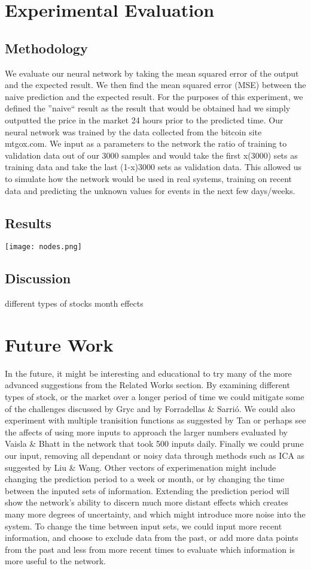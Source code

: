 \documentclass[a4paper,11pt]{article}
\begin{document}
\section{Experimental Evaluation}
\subsection{Methodology}
We evaluate our neural network by taking the mean squared error of the output and the expected result. We then find the mean squared error (MSE) between the naive prediction and the expected result. For the purposes of this experiment, we defined the ''naive`` result as the result that would be obtained had we simply outputted the price in the market 24 hours prior to the predicted time. 
Our neural network was trained by the data collected from the bitcoin site mtgox.com. We input as a parameters to the network the ratio of training to validation data out of our 3000 samples and would take the first x(3000) sets as training data and take the last (1-x)3000 sets as validation data. This allowed us to simulate  how the network would be used in real systems, training on recent data and predicting the unknown values for events in the next few days/weeks. 
\subsection{Results}

\texttt{[image: nodes.png]}
\subsection{Discussion}
different types of stocks
month effects


\section{Future Work}

In the future, it might be interesting and educational to try many of the more advanced suggestions from the Related Works section. By examining different types of stock, or the market over a longer period of time we could mitigate some of the challenges discussed by Gryc and  by Forradellas \& Sarrió. We could also experiment with multiple tranisition functions as suggested by Tan or perhaps see the affects of using more inputs to approach the larger numbers evaluated by Vaisla \& Bhatt in the network that took 500 inputs daily. Finally we could prune our input, removing all dependant or noisy data through methods such as ICA as suggested by Liu \& Wang. Other vectors of experimenation might include changing the prediction period to a week or month, or by changing the time between the inputed sets of information. Extending the prediction period will show the network's ability to discern much more distant effects which creates many more degrees of uncertainty, and which might introduce more noise into the 
system. To change the time between input sets, we could input more recent information, and choose to exclude data from the past, or add more data points from the past and less from more recent times to evaluate which information is more useful to the network.
\end{document}
